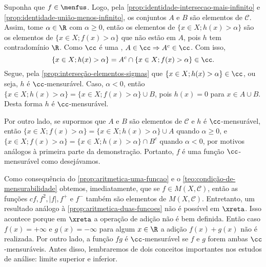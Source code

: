 \begin{prova}
    Suponha que $f \in \menfus$. 
    Logo, pela \ref{prop:identidade-intersecao-mais-infinito} e \ref{prop:identidade-união-menos-infinito}, os conjuntos $A$ e $B$ são elementos de $\mathcal{C}$.
    Assim, tome $\alpha \in \R$ com $\alpha \geq 0$, então os elementos de $\{x \in X; h(x) > \alpha\}$ são os elementos de $\{x \in X; f(x) > \alpha\}$ que não estão em $A$, pois $h$ tem contradomínio $\R$.
    Como $\cc$ é uma \sigal\hspace{-0.1cm}, $A \in \cc \Rightarrow A^c \in \cc$. 
    Com isso, 
    \vspace{-0.2cm}
    $$
    \{x \in X; h(x) > \alpha\} = A^c\cap \{x \in X; f(x) > \alpha\} \in \cc.
    \vspace{-0.2cm}
    $$
    Segue, pela  \ref{prop:interseção-elementos-sigmas} que $\{x \in X; h(x) > \alpha\} \in \cc$, ou seja, $h$ é $\cc$-mensurável.
    Caso, $\alpha < 0$, então $\{x \in X; h(x) > \alpha\} = \{x \in  X ; f(x) > \alpha\} \cup B $, pois $h(x) = 0$ para $x \in A \cup B$.
    Desta forma $h$ é $\cc$-mensurável.

    Por outro lado, se supormos que $A$ e $B$ são elementos de $\mathcal{C}$ e $h$ é $\cc$-mensurável, então
    $
    \{x \in X; f(x) > \alpha\} 
    = 
    \{x \in  X ; h(x) > \alpha\} \cup A
    $
    quando $\alpha \geq 0$, e 
    $
    \{x \in X; f(x) > \alpha\} 
    = 
    \{x \in  X ; h(x) > \alpha\} \cap B^c 
    $
    quando  $\alpha < 0$, por motivos análogos à primeira parte da demonstração.
    Portanto, $f$ é uma função $\cc$-mensurável como desejávamos.
\end{prova}

Como consequência do \ref{prop:aritmetica-uma-funcao} e o \ref{teo:condição-de-mensurabilidade} obtemos, imediatamente, que se $ f \in M(X,\mathcal{C})$, então as funções $cf, f^2, |f|, f^+$ e $f^-$ também são elementos de $M(X, \mathcal{C})$.
Entretanto, um resultado análogo à \ref{prop:aritmetica-duas-funcoes} não é possível em $\xreta$.
Isso acontece porque em $\xreta$ a operação de adição não é bem definida.
Então caso $f(x) = +\infty$ e $g(x) = -\infty$ para algum $x \in \R$ a adição
$f(x) + g(x)$ não é realizada.
Por outro lado, a função $fg$ é $\cc$-mensurável se $f$ e $g$ forem ambas $\cc$-mensuráveis.
Antes disso, lembraremos de dois conceitos importantes nos estudos de análise: limite superior e inferior.

